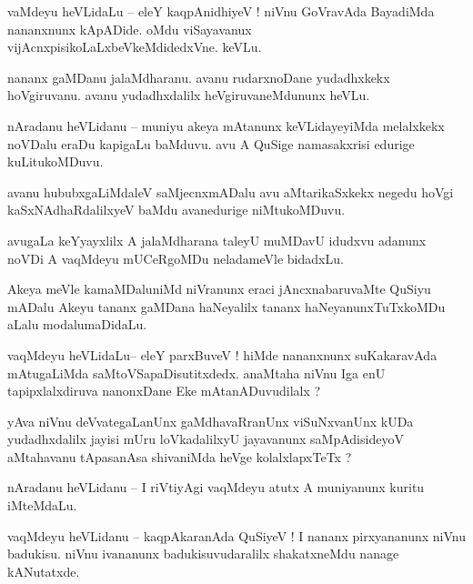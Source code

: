 \documentclass{article}
\begin{document}
\begin{mn}%
vaMdeyu heVLidaLu -- eleY kaqpAnidhiyeV ! niVnu GoVravAda BayadiMda nananxnunx kApADide. oMdu 
viSayavanux vijAcnxpisikoLaLxbeVkeMdidedxVne. keVLu.
\end{mn}

\begin{mn}%
nananx gaMDanu jalaMdharanu. avanu rudarxnoDane yudadhxkekx hoVgiruvanu. avanu yudadhxdalilx 
heVgiruvaneMdununx heVLu.
\end{mn}

\begin{mn}%
nAradanu heVLidanu -- muniyu akeya mAtanunx keVLidayeyiMda melalxkekx noVDalu eraDu kapigaLu 
baMduvu. avu A QuSige namasakxrisi edurige kuLitukoMDuvu.
\end{mn}

\begin{mn}%
avanu hububxgaLiMdaleV saMjecnxmADalu avu aMtarikaSxkekx negedu hoVgi kaSxNAdhaRdalilxyeV baMdu 
avanedurige niMtukoMDuvu.
\end{mn}

\begin{mn}%
avugaLa keYyayxlilx A jalaMdharana taleyU muMDavU idudxvu adanunx noVDi A vaqMdeyu mUCeRgoMDu 
neladameVle bidadxLu.
\end{mn}

\begin{mn}%
Akeya meVle kamaMDaluniMd niVranunx eraci jAncxnabaruvaMte QuSiyu mADalu Akeyu tananx gaMDana 
haNeyalilx tananx haNeyanunxTuTxkoMDu aLalu modalumaDidaLu.
\end{mn}

\begin{mn}%
vaqMdeyu heVLidaLu-- eleY parxBuveV ! hiMde nananxnunx suKakaravAda mAtugaLiMda 
saMtoVSapaDisutitxdedx. anaMtaha niVnu Iga enU tapipxlalxdiruva nanonxDane Eke mAtanADuvudilalx ?
\end{mn}

\begin{mn}%
yAva niVnu deVvategaLanUnx gaMdhavaRranUnx viSuNxvanUnx kUDa yudadhxdalilx jayisi mUru 
loVkadalilxyU jayavanunx saMpAdisideyoV aMtahavanu tApasanAsa shivaniMda heVge kolalxlapxTeTx ?
\end{mn}

\begin{mn}%
nAradanu heVLidanu -- I riVtiyAgi vaqMdeyu atutx A muniyanunx kuritu iMteMdaLu.
\end{mn}

\begin{mn}%
vaqMdeyu heVLidanu -- kaqpAkaranAda QuSiyeV ! I nananx pirxyananunx niVnu badukisu. niVnu ivananunx 
badukisuvudaralilx shakatxneMdu nanage kANutatxde.
\end{mn}
\end{document}
